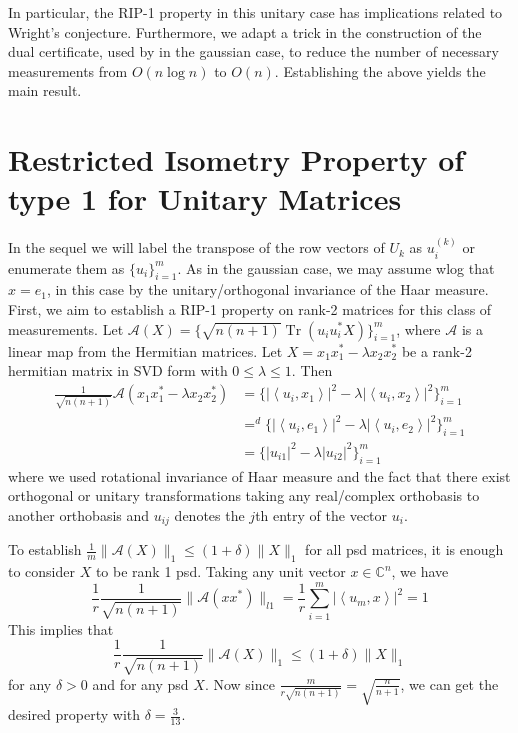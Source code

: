 \documentclass[11pt]{article}
\newtheorem{theorem}{Theorem}[section]
\newcommand{\<}{\langle}
\renewcommand{\>}{\rangle}
\newcommand{\cA}{\mathcal{A}}
\newcommand{\tr}{\operatorname{Tr}}
\numberwithin{equation}{section}
\begin{document}
In particular, the RIP-1 property in this unitary case has implications related to Wright's conjecture. Furthermore, we adapt a trick in the construction of the dual certificate, used by \cite{Five} in the gaussian case, to reduce the number of necessary measurements from $O(n\log n)$ to $O(n)$. Establishing the above yields the main result.

\section{Restricted Isometry Property of type 1 for Unitary Matrices}
 In the sequel we will label the transpose of the row vectors of $U_{k}$ as $u_{i}^{(k)}$ or enumerate them as $\{u_{i}\}_{i=1}^{m}$. As in the gaussian case, we may assume wlog that $x = e_1$, in this case by the unitary/orthogonal invariance of the Haar measure.\\

First, we aim to establish a RIP-1 property on rank-2 matrices  for this class of measurements. Let $\cA(X) = \{\sqrt{n(n+1)} \tr(u_{i} u_{i}^* X) \}_{i=1}^m$, where $\cA$ is a linear map from the Hermitian matrices. Let $X = x_1 x_1^* - \lambda x_2 x_2^*$ be a rank-2 hermitian matrix in SVD form with $0\leq \lambda \leq 1$. Then
\begin{align*}
\frac{1}{\sqrt{n(n+1)}}\cA(x_1 x_1^* - \lambda x_2 x_2^*) &= \{ |\left<u_i,x_1 \right>|^2 - \lambda |\left<u_i,x_2\right>|^2 \}_{i=1}^{m}  \\
&=^d  \{ |\left<u_i,e_1 \right>|^2 - \lambda |\left<u_i,e_2\right>|^2 \}_{i=1}^{m}\\
& = \{ |u_{i1}|^2 - \lambda |u_{i2}|^2 \}_{i=1}^{m}
\end{align*} 
where we used rotational invariance of Haar measure and the fact that there exist orthogonal or unitary transformations taking any real/complex orthobasis to another orthobasis and $u_{ij}$ denotes the $j$th entry  of the vector $u_i$. 

To establish $\frac{1}{m}\|\cA(X)\|_1 \leq (1+\delta) \|X\|_1$ for all psd matrices, it is enough to consider $X$ to be rank 1 psd. Taking any unit vector $x \in \mathbb{C}^n$, we have
\[
\frac{1}{r}\frac{1}{\sqrt{n(n+1)}}\|\cA(xx^*)\|_{l1} = \frac{1}{r}\sum_{i=1}^m |\left<u_{m},x\right>|^2 = 1
\]
This implies that 
\[
\frac{1}{r}\frac{1}{\sqrt{n(n+1)}}\|\cA(X)\|_1 \leq (1+\delta) \|X\|_1
\]
for any $\delta > 0$ and for any psd $X$. Now since $\frac{m}{r\sqrt{n(n+1)}} = \sqrt{\frac{n}{n+1}}$, we can get the desired property with $\delta = \frac{3}{13}$.  
\end{document}
